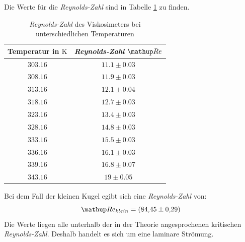 Die Werte für die \emph{Reynolds-Zahl} sind in Tabelle \ref{tab:rey_visko} %
zu finden.

\begin{table}
\centering
\begin{tabular} {cc}
  \toprule
  Temperatur in $\si{\kelvin}$ & \emph{Reynolds-Zahl} $\map{Re}$ \\
  \midrule
  $\num{303.16}$ & $\num{11.1}\pm \num{0.03}$ \\
  $\num{308.16}$ & $\num{11.9}\pm \num{0.03}$ \\
  $\num{313.16}$ & $\num{12.1}\pm \num{0.04}$ \\
  $\num{318.16}$ & $\num{12.7}\pm \num{0.03}$ \\
  $\num{323.16}$ & $\num{13.4}\pm \num{0.03}$ \\
  $\num{328.16}$ & $\num{14.8}\pm \num{0.03}$ \\
  $\num{333.16}$ & $\num{15.5}\pm \num{0.03}$ \\
  $\num{336.16}$ & $\num{16.1}\pm \num{0.03}$ \\
  $\num{339.16}$ & $\num{16.8}\pm \num{0.07}$ \\
  $\num{343.16}$ & $\num{19}\pm \num{0.05}$ \\
\bottomrule
\end{tabular}
\caption{\emph{Reynolds-Zahl} des Viskosimeters bei unterschiedlichen Temperaturen} %
\label{tab:rey_visko}
\end{table}


Bei dem Fall der kleinen Kugel egibt sich eine \emph{Reynolds-Zahl} von:
\begin{equation*}%
\map{Re}_{klein}=\left(\num{84.45}\pm\num{0.29}\right)
\end{equation*}
Die Werte liegen alle unterhalb der in der Theorie angesprochenen kritischen \emph{Reynolds-Zahl}. %
Deshalb handelt es sich um eine laminare Strömung.


